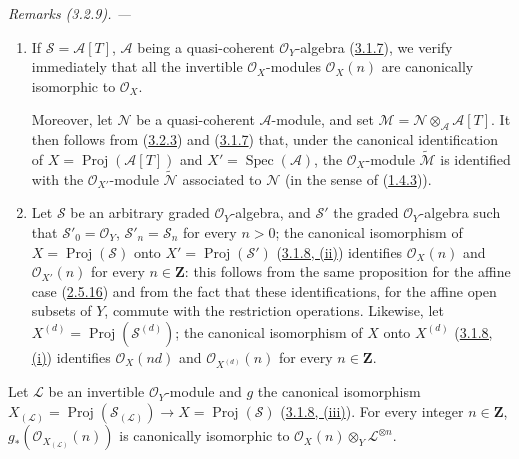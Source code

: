 \par\medskip\noindent\textit{Remarks (3.2.9). ---\ }
\begin{enumerate}
  \item[\rm(i)] If $\mathcal{S}=\mathcal{A}[T]$, $\mathcal{A}$ being a
    quasi-coherent $\mathcal{O}_Y$-algebra
    (\hyperref[II.3.1.7]{3.1.7}), we verify immediately that all the
    invertible $\mathcal{O}_X$-modules $\mathcal{O}_X(n)$ are canonically
    isomorphic to $\mathcal{O}_X$.

    Moreover, let $\mathcal{N}$ be a quasi-coherent $\mathcal{A}$-module, and
    set $\mathcal{M}=\mathcal{N}\otimes_{\mathcal{A}}\mathcal{A}[T]$. It then
    follows from (\hyperref[II.3.2.3]{3.2.3}) and
    (\hyperref[II.3.1.7]{3.1.7}) that, under the canonical identification
    of $X=\operatorname{Proj}(\mathcal{A}[T])$ and
    $X'=\operatorname{Spec}(\mathcal{A})$, the $\mathcal{O}_X$-module
    $\widetilde{\mathcal{M}}$ is identified with the $\mathcal{O}_{X'}$-module
    $\widetilde{\mathcal{N}}$ associated to $\mathcal{N}$ (in the sense of
    (\hyperref[II.1.4.3]{1.4.3})).
  \item[\rm(ii)] Let $\mathcal{S}$ be an arbitrary graded
    $\mathcal{O}_Y$-algebra, and $\mathcal{S}'$ the graded
    $\mathcal{O}_Y$-algebra such that
    $\mathcal{S}'_0=\mathcal{O}_Y$, $\mathcal{S}'_n=\mathcal{S}_n$ for every
    $n>0$; the canonical isomorphism of
    $X=\operatorname{Proj}(\mathcal{S})$ onto
    $X'=\operatorname{Proj}(\mathcal{S}')$
    (\hyperref[II.3.1.8]{3.1.8, (ii)}) identifies $\mathcal{O}_X(n)$ and
    $\mathcal{O}_{X'}(n)$ for every $n\in\mathbf{Z}$: this follows from the
    same proposition for the affine case (\hyperref[II.2.5.16]{2.5.16})
    and from the fact that these identifications, for the affine open subsets
    of $Y$, commute with the restriction operations. Likewise, let
    $X^{(d)}=\operatorname{Proj}(\mathcal{S}^{(d)})$; the canonical
    isomorphism of $X$ onto $X^{(d)}$
    (\hyperref[II.3.1.8]{3.1.8, (i)}) identifies $\mathcal{O}_X(nd)$ and
    $\mathcal{O}_{X^{(d)}}(n)$ for every $n\in\mathbf{Z}$.
\end{enumerate}

\begin{proposition}[3.2.10]
\label{II.3.2.10}
Let $\mathcal{L}$ be an invertible $\mathcal{O}_Y$-module and $g$ the
canonical isomorphism
$X_{(\mathcal{L})}=\operatorname{Proj}(\mathcal{S}_{(\mathcal{L})})
\to X=\operatorname{Proj}(\mathcal{S})$
(\hyperref[II.3.1.8]{3.1.8, (iii)}). For every integer $n\in\mathbf{Z}$,
$g_*(\mathcal{O}_{X_{(\mathcal{L})}}(n))$ is canonically isomorphic to
$\mathcal{O}_X(n)\otimes_Y\mathcal{L}^{\otimes n}$.
\end{proposition}


